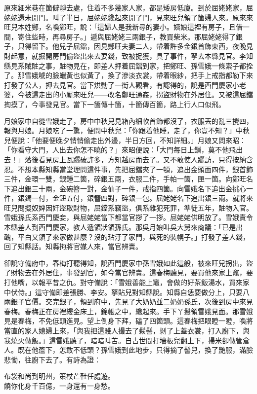 原來細米巷在箇僻靜去處，住着不多幾家人家，都是矮房低廈。到於屈姥姥家，屈姥姥還未開門。叫了半日，屈姥姥纔起來開了門，見來旺兒領了箇婦人來。原來來旺兒本姓鄭，名喚鄭旺，說：「這婦人是我新尋的妻小。姨娘這裡有房子，且借一間，寄住些時，再尋房子。」遞與屈姥姥三兩銀子，教買柴米。那屈姥姥得了銀子，只得留下。他兒子屈鐺，因見鄭旺夫妻二人，帶着許多金銀首飾東西，夜晚見財起意，就掘開房門偷盜出來去耍錢，致被捉獲，具了事件，拏去本縣見官。李知縣見系賊賍之事，賍物見在，即差人押着屈鐺到家，把鄭旺、孫雪娥一條索子都拴了。那雪娥唬的臉蠟黃也似黃了，換了滲淡衣裳，帶着眼紗，把手上戒指都勒下來打發了公人，押去見官。當下烘動了一街人觀看，有認得的，說是西門慶家小老婆，今被這走出的小厮來旺兒——改名鄭旺通姦，拐盜財物在外居住。又被這屈鐺掏摸了，今事發見官。當下一箇傳十箇，十箇傳百箇，路上行人口似飛。{}

月娘家中自從雪娥走了，房中中秋兒見箱內細軟首飾都沒了，衣服丟的亂三攪四，報與月娘。月娘吃了一驚，便問中秋兒：「你跟着他睡，走了，你豈不知？」中秋兒便說：「他要便晚夕悄悄偷走出外邊，半日方回，不知詳細。」月娘又問來昭：「你看守大門，人出去你怎不曉的？」來昭便說：「大門每日上鎖，莫不他飛出去！」落後看見房上瓦躧破許多，方知越房而去了。又不敢使人躧訪，只得按納含忍。不想本縣知縣當堂理問這件事，先把屈鐺夾了一頓，追出金頭面四件，銀首飾三件，金環一雙，銀鍾二箇，碎銀五兩，衣服二件，手帕一箇，匣一箇。向鄭旺名下追出銀三十兩，金碗簪一對，金仙子一件，戒指四箇。向雪娥名下追出金挑心一件，銀鐲一付，金鈕五付，銀簪四對，碎銀一包。屈姥姥名下追出銀三兩。就將來旺兒問擬奴婢因奸盜取財物，屈鐺系竊盜，俱系雜犯死罪，準徒五年，賍物入官。雪娥孫氏系西門慶妾，與屈姥姥當下都當官拶了一拶。屈姥姥供明放了。雪娥責令本縣差人到西門慶家，教人遞領狀領孫氏。那吳月娘叫吳大舅來商議：「已是出醜，平白又領了來家做甚麼？{}沒的玷汙了家門，與死的裝幌子。」打發了差人錢，回了知縣話。知縣拘將官媒人來，當官辨賣。

卻說守備府中，春梅打聽得知，說西門慶家中孫雪娥如此這般，被來旺兒拐出，盜了財物去在外居住，事發到官，如今當官辨賣。這春梅聽見，要買他來家上竈，要打他嘴，以報平昔之仇。對守備說：「雪娥善能上竈，會做的好茶飯湯水，買來家中伏侍。」這守備即差張勝、李安。拏貼兒對知縣說。知縣自恁要做分上，只要八兩銀子官價。交完銀子，領到府中，先見了大奶奶並二奶奶孫氏，次後到房中來見春梅。春梅正在房裡縷金床上，錦帳之中，纔起來。{}手下丫鬟領雪娥見面。那雪娥見是春梅，不免低頭進見。望上倒身下拜，磕了四箇頭。這春梅把眼瞪一瞪，{}喚將當直的家人媳婦上來，「與我把這賤人撮去了鬏髻，剝了上蓋衣裳，打入廚下，與我燒火做飯。」這雪娥聽了，暗暗叫苦。自古世間打墻板兒翻上下，掃米卻做管倉人。既在他簷下，怎敢不低頭？孫雪娥到此地步，只得摘了髻兒，換了艷服，滿臉悲慟，往廚下去了。有詩為證：

\begin{myquote}
布袋和尚到明州，策杖芒鞋任處遊。\\饒你化身千百億，一身還有一身愁。
\end{myquote}

